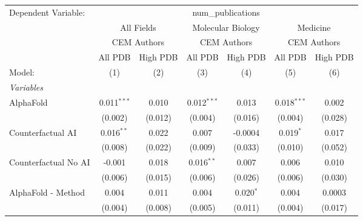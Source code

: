 \begingroup
\centering
\begin{tabular}{lcccccc}
   \tabularnewline \midrule \midrule
   Dependent Variable: & \multicolumn{6}{c}{num\_publications}\\
 & \multicolumn{2}{c}{All Fields} & \multicolumn{2}{c}{Molecular Biology} & \multicolumn{2}{c}{Medicine} \\
\cmidrule(lr){2-3} \cmidrule(lr){4-5} \cmidrule(lr){6-7}
 & \multicolumn{2}{c}{CEM Authors} & \multicolumn{2}{c}{CEM Authors} & \multicolumn{2}{c}{CEM Authors} \\
\cmidrule(lr){2-3} \cmidrule(lr){4-5} \cmidrule(lr){6-7}
 & \multicolumn{1}{c}{All PDB} & \multicolumn{1}{c}{High PDB} & \multicolumn{1}{c}{All PDB} & \multicolumn{1}{c}{High PDB} & \multicolumn{1}{c}{All PDB} & \multicolumn{1}{c}{High PDB} \\
\cmidrule(lr){2-2} \cmidrule(lr){3-3} \cmidrule(lr){4-4} \cmidrule(lr){5-5} \cmidrule(lr){6-6} \cmidrule(lr){7-7}
   Model:                                                     & (1)            & (2)     & (3)           & (4)          & (5)            & (6)\\  
   \midrule
   \emph{Variables}\\
   AlphaFold                                                  & 0.011$^{***}$  & 0.010   & 0.012$^{***}$ & 0.013        & 0.018$^{***}$  & 0.002\\   
                                                              & (0.002)        & (0.012) & (0.004)       & (0.016)      & (0.004)        & (0.028)\\   
   Counterfactual AI                                          & 0.016$^{**}$   & 0.022   & 0.007         & -0.0004      & 0.019$^{*}$    & 0.017\\   
                                                              & (0.008)        & (0.022) & (0.009)       & (0.033)      & (0.010)        & (0.052)\\   
   Counterfactual No AI                                       & -0.001         & 0.018   & 0.016$^{**}$  & 0.007        & 0.006          & 0.010\\   
                                                              & (0.006)        & (0.015) & (0.006)       & (0.026)      & (0.006)        & (0.030)\\   
   AlphaFold - Method                                         & 0.004          & 0.011   & 0.004         & 0.020$^{*}$  & 0.004          & 0.0003\\   
                                                              & (0.004)        & (0.008) & (0.005)       & (0.011)      & (0.004)        & (0.017)\\   

\end{tabular}
